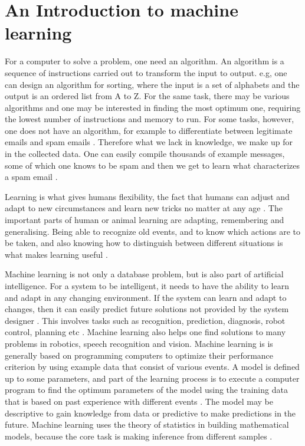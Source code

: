 \section{An Introduction to machine learning}
\label{Intro}

For a computer to solve a problem, one need an algorithm. An algorithm
is a sequence of instructions carried out to transform
the input to output. e.g, one can design an algorithm for
sorting, where the input is a set of alphabets and the output is an ordered
list from A to Z. For the same task, there may be various algorithms and one may be
interested in finding the most optimum one, requiring the lowest number of
instructions and memory to run. For some tasks, however, one does not have an algorithm, for example to differentiate between legitimate emails and spam emails \citep{alpaydin2014introduction}. Therefore what we lack in knowledge, we make up for in the collected data. One can easily compile thousands of example messages, some of which one knows to be spam and then we get to learn what characterizes a spam email \citep{alpaydin2014introduction}. 

Learning is what gives humans flexibility, the fact that humans can adjust and adapt to new circumstances and learn new
tricks no matter at any age \citep{marsland2015machine}. The important parts of human or animal learning are adapting, remembering and generalising. Being able to recognize old events, and to know which actions are to be taken, and also knowing how to distinguish between different situations is what makes learning useful \citep{marsland2015machine}. 

 Machine learning is not only a database problem, but is also part
of artificial intelligence. For a system to be intelligent, it needs to have the ability to learn and adapt in any changing environment. If the system can learn and
adapt to changes, then it can easily predict future solutions not provided by the system designer \citep{alpaydin2014introduction}. This involves tasks such as  recognition, prediction, diagnosis, robot control,  
planning etc \citep{nilsson1996introduction}.
Machine learning also helps one find solutions to many problems in robotics, speech recognition and vision. Machine learning is is generally based on programming computers to optimize their performance criterion by using example data that consist of various events. A model is defined
up to some parameters, and part of the learning process is to execute a computer program
to find the optimum parameters of the model using the training data that is based on past experience with different events \citep{alpaydin2014introduction}. The model may be descriptive to gain knowledge from data or predictive to make predictions in the
future.
Machine learning uses the theory of statistics in building mathematical
models, because the core task is making inference from different samples \citep{alpaydin2014introduction}.


